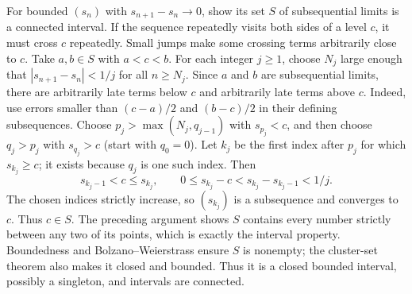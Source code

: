 \goal For bounded $(s_n)$ with $s_{n+1}-s_n\to0$, show its set $S$
of subsequential limits is a connected interval.
\idea If the sequence repeatedly visits both sides of a level $c$,
it must cross $c$ repeatedly. Small jumps make some crossing terms
arbitrarily close to $c$.
Take $a,b\in S$ with $a<c<b$. For each integer $j\ge1$, choose $N_j$
large enough that $|s_{n+1}-s_n|<1/j$ for all $n\ge N_j$. Since $a$
and $b$ are subsequential limits, there are arbitrarily late terms
below $c$ and arbitrarily late terms above $c$. Indeed, use errors
smaller than $(c-a)/2$ and $(b-c)/2$ in their defining subsequences.
Choose $p_j>\max(N_j,q_{j-1})$ with $s_{p_j}<c$, and then choose
$q_j>p_j$ with $s_{q_j}>c$ (start with $q_0=0$). Let $k_j$ be the
first index after $p_j$ for which $s_{k_j}\ge c$; it exists because
$q_j$ is one such index. Then
\[
 s_{k_j-1}<c\le s_{k_j},\qquad
 0\le s_{k_j}-c<s_{k_j}-s_{k_j-1}<1/j.
\]
The chosen indices strictly increase, so $(s_{k_j})$ is a subsequence
and converges to $c$. Thus $c\in S$.
The preceding argument shows $S$ contains every number strictly
between any two of its points, which is exactly the interval property.
Boundedness and Bolzano--Weierstrass ensure $S$ is nonempty; the
cluster-set theorem also makes it closed and bounded. Thus it is a
closed bounded interval, possibly a singleton, and intervals are connected.
